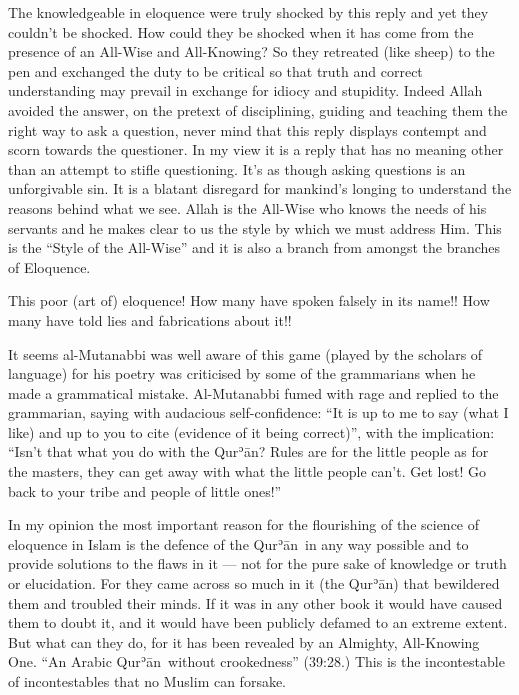 \documentclass[12pt]{memoir}
\def\´{ʾ} %
\def \Quran{Qur\-\´ān} %
\def\–{-\hskip0pt}
\newcommand{\QRef}[1]{{\color{darkblue}#1}}
\begin{document}
The knowledgeable in eloquence were truly shocked by this reply
and yet they couldn’t be shocked.
How could they be shocked when it has come from the presence
of an All-Wise and All-Knowing?
So they retreated (like sheep) to the pen and exchanged the duty to be critical
so that truth and correct understanding may prevail in exchange for idiocy
and stupidity. Indeed Allah avoided the answer, on the pretext of disciplining,
guiding and teaching them the right way to ask a question,
never mind that this reply displays contempt and scorn towards the questioner.
In my view it is a reply that has no meaning other than an attempt
to stifle questioning.
It’s as though asking questions is an unforgivable sin.
It is a blatant disregard for mankind’s longing to understand
the reasons behind what we see.
Allah is the All-Wise who knows the needs of his servants
and he makes clear to us the style by which we must address Him.
This is the “Style of the All-Wise” and it is also a branch
from amongst the branches of Eloquence.

This poor (art of) eloquence!
How many have spoken falsely in its name!!
How many have told lies and fabrications about it!!

It seems al\–Mutanabbi was well aware of this game
(played by the scholars of language)
for his poetry was criticised by some of the grammarians
when he made a grammatical mistake.
Al-Mutanabbi fumed with rage and replied to the grammarian,
saying with audacious self\–confidence:
“It is up to me to say (what I like) and up to you to cite
(evidence of it being correct)”, with the implication:
“Isn’t that what you do with the \Quran?
Rules are for the little people as for the masters,
they can get away with what the little people can’t.
Get lost! Go back to your tribe and people of little ones!”

In my opinion the most important reason for the flourishing of the science
of eloquence in Islam is the defence of the \Quran\ in any way possible
and to provide solutions to the flaws in it —
not for the pure sake of knowledge or truth or elucidation.
For they came across so much in it (the \Quran) that bewildered them
and troubled their minds.
If it was in any other book it would have caused them to doubt it,
and it would have been publicly defamed to an extreme extent.
But what can they do, for it has been revealed by an Almighty, All-Knowing One.
“An Arabic \Quran\ without crookedness” (\QRef{39:28}.)
This is the incontestable of incontestables that no Muslim can forsake.
\end{document}
